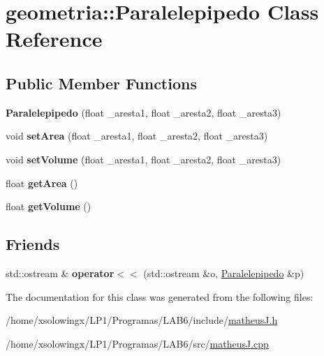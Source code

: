 \hypertarget{classgeometria_1_1Paralelepipedo}{}\section{geometria\+:\+:Paralelepipedo Class Reference}
\label{classgeometria_1_1Paralelepipedo}
\subsection*{Public Member Functions}
\begin{DoxyCompactItemize}
\item 
\mbox{\label{classgeometria_1_1Paralelepipedo_a644bf38eebe02a63e504e3002d20793b}} 
{\bfseries Paralelepipedo} (float \+\_\+aresta1, float \+\_\+aresta2, float \+\_\+aresta3)
\item 
\mbox{\label{classgeometria_1_1Paralelepipedo_a74ca3d1ae19b3aa5a668d9acfc67b906}} 
void {\bfseries set\+Area} (float \+\_\+aresta1, float \+\_\+aresta2, float \+\_\+aresta3)
\item 
\mbox{\label{classgeometria_1_1Paralelepipedo_a226e91eb4d4980df80d7357de7ead75c}} 
void {\bfseries set\+Volume} (float \+\_\+aresta1, float \+\_\+aresta2, float \+\_\+aresta3)
\item 
\mbox{\label{classgeometria_1_1Paralelepipedo_ad081fe5cc56531c3a4bae8ca975f9b3b}} 
float {\bfseries get\+Area} ()
\item 
\mbox{\label{classgeometria_1_1Paralelepipedo_abfd2fba33ebefc88a5371a3d5ed69ed9}} 
float {\bfseries get\+Volume} ()
\end{DoxyCompactItemize}
\subsection*{Friends}
\begin{DoxyCompactItemize}
\item 
\mbox{\label{classgeometria_1_1Paralelepipedo_a9835ed43bb611963e4586e29d2143934}} 
std\+::ostream \& {\bfseries operator$<$$<$} (std\+::ostream \&o, \hyperlink{classgeometria_1_1Paralelepipedo}{Paralelepipedo} \&p)
\end{DoxyCompactItemize}


The documentation for this class was generated from the following files\+:\begin{DoxyCompactItemize}
\item 
/home/xsolowingx/\+L\+P1/\+Programas/\+L\+A\+B6/include/\hyperlink{matheusJ_8h}{matheus\+J.\+h}\item 
/home/xsolowingx/\+L\+P1/\+Programas/\+L\+A\+B6/src/\hyperlink{matheusJ_8cpp}{matheus\+J.\+cpp}\end{DoxyCompactItemize}

